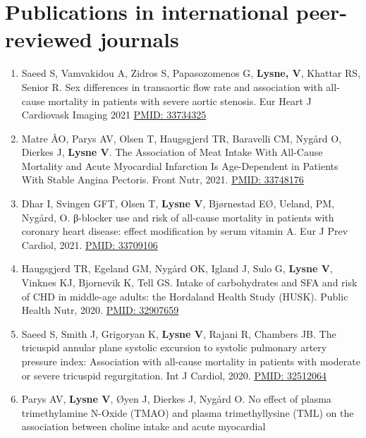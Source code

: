 \documentclass[11pt, a4paper]{awesome-cv}
\providecommand{\tightlist}{%
	\setlength{\itemsep}{0pt}\setlength{\parskip}{0pt}}
\begin{document}
\hypertarget{publications-in-international-peer-reviewed-journals}{%
\section{Publications in international peer-reviewed
journals}\label{publications-in-international-peer-reviewed-journals}}

\begin{enumerate}
\def\labelenumi{\arabic{enumi}.}
\tightlist
\item
  Saeed S, Vamvakidou A, Zidros S, Papasozomenos G, \textbf{Lysne, V},
  Khattar RS, Senior R. Sex differences in transaortic flow rate and
  association with all-cause mortality in patients with severe aortic
  stenosis. Eur Heart J Cardiovask Imaging 2021
  \href{https://pubmed.ncbi.nlm.nih.gov/33734325/}{PMID: 33734325}
\item
  Matre ÅO, Parys AV, Olsen T, Haugsgjerd TR, Baravelli CM, Nygård O,
  Dierkes J, \textbf{Lysne V}. The Association of Meat Intake With
  All-Cause Mortality and Acute Myocardial Infarction Is Age-Dependent
  in Patients With Stable Angina Pectoris. Front Nutr, 2021.
  \href{https://pubmed.ncbi.nlm.nih.gov/33748176/}{PMID: 33748176}
\item
  Dhar I, Svingen GFT, Olsen T, \textbf{Lysne V}, Bjørnestad EØ, Ueland,
  PM, Nygård, O. β-blocker use and risk of all-cause mortality in
  patients with coronary heart disease: effect modification by serum
  vitamin A. Eur J Prev Cardiol, 2021.
  \href{https://pubmed.ncbi.nlm.nih.gov/33709106/}{PMID: 33709106}
\item
  Haugsgjerd TR, Egeland GM, Nygård OK, Igland J, Sulo G, \textbf{Lysne
  V}, Vinknes KJ, Bjornevik K, Tell GS. Intake of carbohydrates and SFA
  and risk of CHD in middle-age adults: the Hordaland Health Study
  (HUSK). Public Health Nutr, 2020.
  \href{https://pubmed.ncbi.nlm.nih.gov/32907659/}{PMID: 32907659}
\item
  Saeed S, Smith J, Grigoryan K, \textbf{Lysne V}, Rajani R, Chambers
  JB. The tricuspid annular plane systolic excursion to systolic
  pulmonary artery pressure index: Association with all-cause mortality
  in patients with moderate or severe tricuspid regurgitation. Int J
  Cardiol, 2020. \href{https://pubmed.ncbi.nlm.nih.gov/32512064/}{PMID:
  32512064}
\item
  Parys AV, \textbf{Lysne V}, Øyen J, Dierkes J, Nygård O. No effect of
  plasma trimethylamine N-Oxide (TMAO) and plasma trimethyllysine (TML)
  on the association between choline intake and acute myocardial

\end{enumerate}
\end{document}
